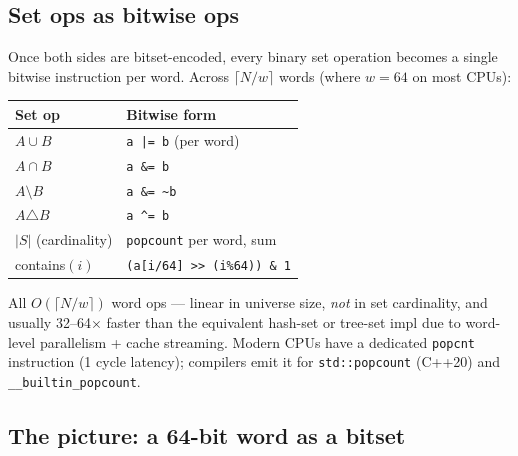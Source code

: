 \documentclass[11pt]{article}
\begin{document}
\subsection*{Set ops as bitwise ops}

Once both sides are bitset-encoded, every binary set operation
becomes a single bitwise instruction per word. Across $\lceil N/w \rceil$
words (where $w = 64$ on most CPUs):

\begin{center}
\begin{tabular}{ll}
\hline
Set op & Bitwise form \\
\hline
$A \cup B$ & \texttt{a |= b} (per word) \\
$A \cap B$ & \texttt{a \&= b} \\
$A \setminus B$ & \texttt{a \&= \~{}b} \\
$A \triangle B$ & \texttt{a \^{}= b} \\
$|S|$ (cardinality) & \texttt{popcount} per word, sum \\
contains$(i)$ & \texttt{(a[i/64] >> (i\%64)) \& 1} \\
\hline
\end{tabular}
\end{center}

All $O(\lceil N / w \rceil)$ word ops --- linear in universe size,
\emph{not} in set cardinality, and usually 32--64$\times$ faster
than the equivalent hash-set or tree-set impl due to word-level
parallelism + cache streaming. Modern CPUs have a dedicated
\texttt{popcnt} instruction (1 cycle latency); compilers emit it
for \texttt{std::popcount} (C++20) and \texttt{\_\_builtin\_popcount}.

\subsection*{The picture: a 64-bit word as a bitset}

\begin{center}
\end{center}
\end{document}
